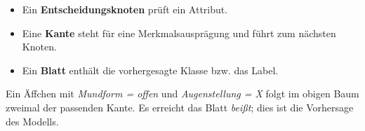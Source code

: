 \documentclass[11pt,a4paper]{article}
\newcommand{\fach}[1]{\textbf{\color{navy}#1}}
\begin{document}
\begin{itemize}
  \item Ein \fach{Entscheidungsknoten} prüft ein Attribut.
  \item Eine \fach{Kante} steht für eine Merkmalsausprägung und führt zum nächsten Knoten.
  \item Ein \fach{Blatt} enthält die vorhergesagte Klasse bzw. das Label.
\end{itemize}

\begin{beispiel}[title=Beispiel: eine Vorhersage]
Ein Äffchen mit \emph{Mundform = offen} und \emph{Augenstellung = X} folgt im obigen Baum zweimal der
passenden Kante. Es erreicht das Blatt \emph{beißt}; dies ist die Vorhersage des Modells.
\end{beispiel}
\endgroup
\end{document}
